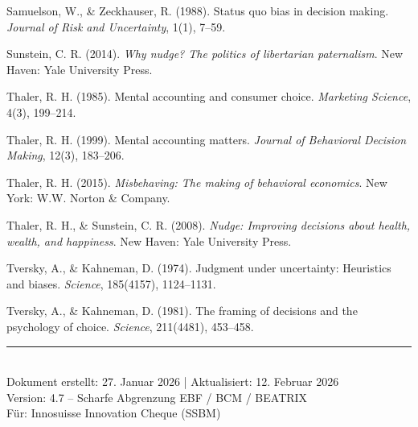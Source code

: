 \documentclass[11pt,a4paper]{article}
\begin{document}
\vspace{0.3cm}
Samuelson, W., \& Zeckhauser, R. (1988). Status quo bias in decision making. \textit{Journal of Risk and Uncertainty}, 1(1), 7--59.

\vspace{0.3cm}
Sunstein, C. R. (2014). \textit{Why nudge? The politics of libertarian paternalism}. New Haven: Yale University Press.

\vspace{0.3cm}
Thaler, R. H. (1985). Mental accounting and consumer choice. \textit{Marketing Science}, 4(3), 199--214.

\vspace{0.3cm}
Thaler, R. H. (1999). Mental accounting matters. \textit{Journal of Behavioral Decision Making}, 12(3), 183--206.

\vspace{0.3cm}
Thaler, R. H. (2015). \textit{Misbehaving: The making of behavioral economics}. New York: W.W. Norton \& Company.

\vspace{0.3cm}
Thaler, R. H., \& Sunstein, C. R. (2008). \textit{Nudge: Improving decisions about health, wealth, and happiness}. New Haven: Yale University Press.

\vspace{0.3cm}
Tversky, A., \& Kahneman, D. (1974). Judgment under uncertainty: Heuristics and biases. \textit{Science}, 185(4157), 1124--1131.

\vspace{0.3cm}
Tversky, A., \& Kahneman, D. (1981). The framing of decisions and the psychology of choice. \textit{Science}, 211(4481), 453--458.

\vspace{2cm}

\begin{center}
\rule{0.4\textwidth}{0.5pt}\\[0.5em]
{\small Dokument erstellt: 27. Januar 2026 | Aktualisiert: 12. Februar 2026}\\
{\small Version: 4.7 -- Scharfe Abgrenzung EBF / BCM / BEATRIX}\\
{\small Für: Innosuisse Innovation Cheque (SSBM)}
\end{center}
\end{document}
